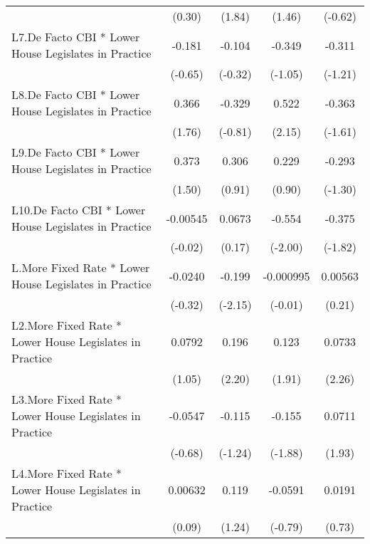 {\begin{longtable}{l*{4}{c}}
                &   (0.30)         &   (1.84)         &   (1.46)         &  (-0.62)         \\
[1em]
L7.De Facto CBI * Lower House Legislates in Practice&   -0.181         &   -0.104         &   -0.349         &   -0.311         \\
                &  (-0.65)         &  (-0.32)         &  (-1.05)         &  (-1.21)         \\
[1em]
L8.De Facto CBI * Lower House Legislates in Practice&    0.366         &   -0.329         &    0.522\sym{*}  &   -0.363         \\
                &   (1.76)         &  (-0.81)         &   (2.15)         &  (-1.61)         \\
[1em]
L9.De Facto CBI * Lower House Legislates in Practice&    0.373         &    0.306         &    0.229         &   -0.293         \\
                &   (1.50)         &   (0.91)         &   (0.90)         &  (-1.30)         \\
[1em]
L10.De Facto CBI * Lower House Legislates in Practice& -0.00545         &   0.0673         &   -0.554\sym{*}  &   -0.375         \\
                &  (-0.02)         &   (0.17)         &  (-2.00)         &  (-1.82)         \\
[1em]
L.More Fixed Rate * Lower House Legislates in Practice&  -0.0240         &   -0.199\sym{*}  &-0.000995         &  0.00563         \\
                &  (-0.32)         &  (-2.15)         &  (-0.01)         &   (0.21)         \\
[1em]
L2.More Fixed Rate * Lower House Legislates in Practice&   0.0792         &    0.196\sym{*}  &    0.123         &   0.0733\sym{*}  \\
                &   (1.05)         &   (2.20)         &   (1.91)         &   (2.26)         \\
[1em]
L3.More Fixed Rate * Lower House Legislates in Practice&  -0.0547         &   -0.115         &   -0.155         &   0.0711         \\
                &  (-0.68)         &  (-1.24)         &  (-1.88)         &   (1.93)         \\
[1em]
L4.More Fixed Rate * Lower House Legislates in Practice&  0.00632         &    0.119         &  -0.0591         &   0.0191         \\
                &   (0.09)         &   (1.24)         &  (-0.79)         &   (0.73)         \\

\end{longtable}}
